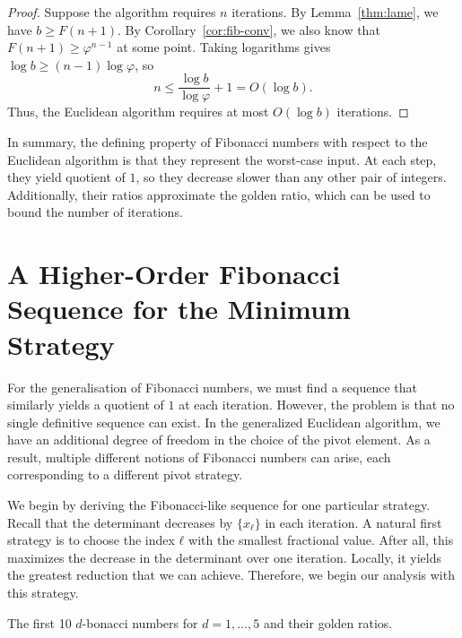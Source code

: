 \begin{proof}
  Suppose the algorithm requires $n$ iterations.
  By Lemma~\ref{thm:lame}, we have $b ≥ F(n+1)$.
  By Corollary~\ref{cor:fib-conv}, we also know that $F(n+1) ≥ φ^{n-1}$ at some point.
  Taking logarithms gives $\log b \geq (n - 1) \log φ$, so
  \[
    n \leq \frac{\log b}{\log φ} + 1 = O(\log b).
  \]
  Thus, the Euclidean algorithm requires at most $O(\log b)$ iterations.
\end{proof}

In summary,
the defining property of Fibonacci numbers with respect to the Euclidean
algorithm is that they represent the worst-case input.
At each step, they yield quotient of $1$, so they decrease slower than any
other pair of integers.
Additionally, their ratios approximate the golden ratio,
which can be used to bound the number of iterations.

\section{A Higher-Order Fibonacci Sequence for the Minimum Strategy}


For the generalisation of Fibonacci numbers,
we must find a sequence that similarly yields a quotient of $1$ at each
iteration.
However, the problem is that no single definitive sequence can exist.
In the generalized Euclidean algorithm, we have an additional degree of freedom
in the choice of the pivot element.
As a result, multiple different notions of Fibonacci numbers can arise,
each corresponding to a different pivot strategy.

We begin by deriving the Fibonacci-like sequence for one particular strategy.
Recall that the determinant decreases by $\{x_ℓ\}$ in each iteration.
A natural first strategy is to choose the index $ℓ$ with the
smallest fractional value.
After all, this maximizes the decrease in the determinant over one iteration.
Locally, it yields the greatest reduction that we can achieve.
Therefore, we begin our analysis with this strategy.

\begin{table}[tbp]
  \caption{The first 10 $d$-bonacci numbers for $d = 1, …, 5$ and their golden ratios.}
  \label{tbl:min-fibonacci}
  \centering
  
\end{table}

